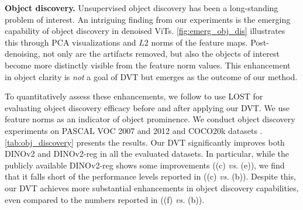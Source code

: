 \documentclass[runningheads]{llncs}
\newcommand{\ours}{DVT\xspace}
\renewcommand{\paragraph}[1]{\vspace{1.25mm}\noindent\textbf{#1}}
\begin{document}
\paragraph{Object discovery.} Unsupervised object discovery has been a long-standing problem of interest. An intriguing finding from our experiments is the emerging capability of object discovery in denoised ViTs. \cref{fig:emerg_obj_dis} illustrates this through PCA visualizations and $L2$ norms of the feature maps. Post-denoising, not only are the artifacts removed, but also the objects of interest become more distinctly visible from the feature norm values. This enhancement in object clarity is \textit{not} a goal of \ours but emerges as the outcome of our method.

To quantitatively assess these enhancements, we follow \cite{darcet2023vision} to use LOST \cite{simeoni2021localizing} for evaluating object discovery efficacy before and after applying our \ours. We use feature norms as an indicator of object prominence. We conduct object discovery experiments on PASCAL VOC 2007 \cite{pascal-voc-2007} and 2012 \cite{pascal-voc-2012} and COCO20k datasets \cite{lin2014microsoft}.
\cref{tab:obj_discovery} presents the results. Our \ours significantly improves both DINOv2 \cite{oquab2023dinov2} and DINOv2-reg \cite{darcet2023vision} in all the evaluated datasets. In particular, while the publicly available DINOv2-reg shows some improvements ((c) \textit{vs.} (e)), we find that it falls short of the performance levels reported in \cite{darcet2023vision} ((c) \textit{vs.} (b)). Despite this, our \ours achieves more substantial enhancements in object discovery capabilities, even compared to the numbers reported in \cite{darcet2023vision} ((f) \textit{vs.} (b)).
\end{document}
